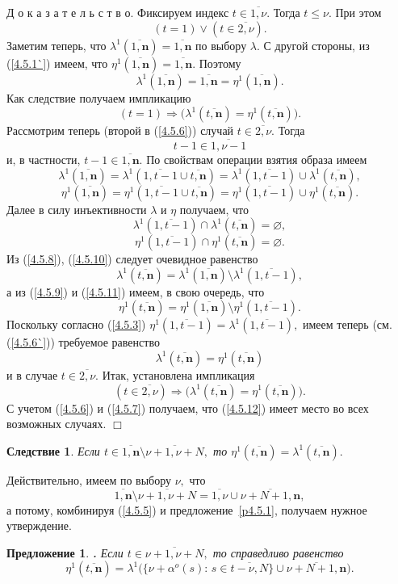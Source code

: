 \documentclass[11pt,twoside,openany]{report}
\newcommand{\bfn}{\begin{equation}}
\newcommand{\efn}{\end{equation}}
\newcommand{\ov}{\overline}
\newcounter{theo}
\newcounter{cor}
\newcounter{pred}
\newtheorem{pred}{Предложение}[section]
\newtheorem{cor}{Следствие}[section]
\newcommand{\TL}{\mbox{\bf{$\!\!$.}}}
\newcommand{\la}{\lambda}
\newcommand{\al}{\alpha}
\newcommand{\emp}{\varnothing}
\begin{document}
{{Д о к а з а т е л ь с т в о. Фиксируем индекс $t\in \ov{1,\nu}.$ Тогда $t\leqslant \nu.$ При этом
\bfn\label{4.5.6}(t=1) \vee (t\in \ov{2,\nu}).
\efn
Заметим теперь, что $\la^1(\ov{1,\mathbf{n}}) = \ov{1,\mathbf{n}}$ по выбору $\la.$
С другой стороны, из (\ref{4.5.1`}) имеем, что $\eta^1(\ov{1,\mathbf{n}}) =\ov{1,\mathbf{n}}.$
Поэтому
\bfn\label{4.5.6`}
\la^1(\ov{1,\mathbf{n}})  =\ov{1,\mathbf{n}} =\eta^1(\ov{1,\mathbf{n}}).
\efn
Как следствие получаем импликацию
\bfn\label{4.5.7}
(t=1)\Longrightarrow \bigl(\la^1(\ov{t,\mathbf{n}}) = \eta^1(\ov{t,\mathbf{n}})\bigl).
\efn
Рассмотрим теперь (второй в (\ref{4.5.6})) случай $t\in \ov{2,\nu}.$ Тогда
$$
t-1 \in \ov{1,\nu-1}
$$
и, в частности, $t-1\in \ov{1,\mathbf{n}}.$ По свойствам операции взятия образа имеем
\bfn\label{4.5.8}
\la^1(\ov{1,\mathbf{n}}) = \la^1(\ov{1,t-1} \cup \ov{t,\mathbf{n}}) = \la^1(\ov{1,t-1})
\cup \la^1(\ov{t,\mathbf{n}}),
\efn
\bfn\label{4.5.9}
\eta^1(\ov{1,\mathbf{n}}) = \eta^1(\ov{1,t-1} \cup \ov{t,\mathbf{n}}) = \eta^1(\ov{1,t-1})
\cup \eta^1(\ov{t,\mathbf{n}}).
\efn
Далее в силу инъективности $\la$ и $\eta$ получаем, что
\bfn\label{4.5.10}
\la^1(\ov{1,t-1}) \cap  \la^1(\ov{t,\mathbf{n}}) = \emp,
\efn
\bfn\label{4.5.11}
\eta^1(\ov{1,t-1}) \cap  \eta^1(\ov{t,\mathbf{n}}) = \emp.
\efn
Из (\ref{4.5.8}), (\ref{4.5.10})  следует очевидное равенство
$$
\la^1(\ov{t,\mathbf{n}}) = \la^1(\ov{1,\mathbf{n}})\setminus \la^1(\ov{1,t-1}),
$$
а из (\ref{4.5.9}) и (\ref{4.5.11}) имеем, в свою очередь, что
$$
\eta^1(\ov{t,\mathbf{n}}) = \eta^1(\ov{1,\mathbf{n}})\setminus \eta^1(\ov{1,t-1}).
$$
Поскольку согласно (\ref{4.5.3}) $\eta^1(\ov{1,t-1}) = \la^1(\ov{1,t-1}),$ имеем теперь
(см. (\ref{4.5.6`})) требуемое равенство
\bfn\label{4.5.12}
\la^1(\ov{t,\mathbf{n}}) = \eta^1(\ov{t,\mathbf{n}})
\efn
и в случае $t\in \ov{2,\nu}.$ Итак, установлена импликация
$$
(t\in \ov{2,\nu}) \Longrightarrow \bigl(\la^1(\ov{t,\mathbf{n}}) = \eta^1(\ov{t,\mathbf{n}})\bigl).
$$
С учетом (\ref{4.5.6}) и (\ref{4.5.7}) получаем, что (\ref{4.5.12}) имеет место во всех
возможных случаях. \hfill $\Box$

\begin{cor}\label{c4.5.1}
Если $t\in \ov{1,\mathbf{n}}\setminus \ov{\nu+1,\nu+N},$ то $\eta^1(\ov{t,\mathbf{n}}) =
\la^1(\ov{t,\mathbf{n}}).$
\end{cor}

Действительно, имеем по выбору $\nu,$ что
$$
\ov{1,\mathbf{n}}\setminus \ov{\nu+1,\nu+N} = \ov{1,\nu} \cup \ov{\nu+N+1,\mathbf{n}},
$$
а потому, комбинируя (\ref{4.5.5}) и предложение~\ref{p4.5.1}, получаем нужное утверждение.
\begin{pred}\label{p4.5.2}
{\TL} Если $t\in \ov{\nu+1,\nu+N},$ то справедливо равенство
\bfn\label{4.5.12`}
\eta^1(\ov{t,\mathbf{n}}) = \la^1\bigl(\{\nu + \al^o(s):\,s\in \ov{t-\nu,N}\} \cup
\ov{\nu+N+1,\mathbf{n}}\bigl).
\efn
\end{pred}

}}
\end{document}
